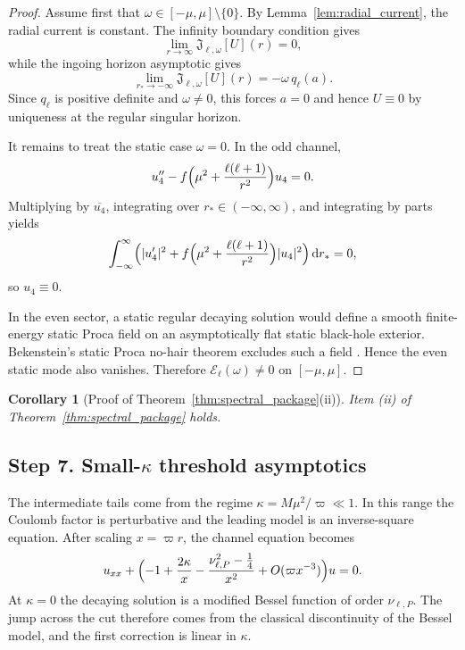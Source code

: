 \documentclass[12pt]{article}
\numberwithin{equation}{section}
\theoremstyle{plain}
\newtheorem{corollary}[theorem]{Corollary}
\theoremstyle{definition}
\theoremstyle{remark}
\newcommand{\dd}{\mathrm d}
\newcommand{\cE}{\mathcal E}
\newcommand{\om}{\omega}
\newcommand{\vp}{\varpi}
\newcommand{\kap}{\kappa}
\begin{document}
\begin{proof}
Assume first that $\om\in[-\mu,\mu]\setminus\{0\}$.  By Lemma~\ref{lem:radial_current}, the radial current is constant.  The infinity boundary condition gives
\[
   \lim_{r\to\infty}\mathfrak J_{\ell,\om}[U](r)=0,
\]
while the ingoing horizon asymptotic gives
\[
   \lim_{r_*\to-\infty}\mathfrak J_{\ell,\om}[U](r)
   =-\om\,q_\ell(a).
\]
Since $q_\ell$ is positive definite and $\om\neq0$, this forces $a=0$ and hence $U\equiv0$ by uniqueness at the regular singular horizon.

It remains to treat the static case $\om=0$.  In the odd channel,
\[
   u_4''-f\Bigl(\mu^2+\frac{\ell(\ell+1)}{r^2}\Bigr)u_4=0.
\]
Multiplying by $\overline{u_4}$, integrating over $r_*\in(-\infty,\infty)$, and integrating by parts yields
\[
   \int_{-\infty}^{\infty}
   \Bigl(
      |u_4'|^2
      +
      f\Bigl(\mu^2+\frac{\ell(\ell+1)}{r^2}\Bigr)|u_4|^2
   \Bigr)\,\dd r_*=0,
\]
so $u_4\equiv0$.

In the even sector, a static regular decaying solution would define a smooth finite-energy static Proca field on an asymptotically flat static black-hole exterior.  Bekenstein's static Proca no-hair theorem excludes such a field \cite{Bekenstein1972a,Bekenstein1972b}.  Hence the even static mode also vanishes.  Therefore $\cE_\ell(\om)\neq0$ on $[-\mu,\mu]$.
\end{proof}

\begin{corollary}[Proof of Theorem~\ref{thm:spectral_package}(ii)]\label{cor:item_ii}
Item \textnormal{(ii)} of Theorem~\ref{thm:spectral_package} holds.
\end{corollary}

\subsection*{Step 7. Small-$\kap$ threshold asymptotics}

The intermediate tails come from the regime $\kap=M\mu^2/\vp\ll1$.  In this range the Coulomb factor is perturbative and the leading model is an inverse-square equation.  After scaling $x=\vp r$, the channel equation becomes
\[
   u_{xx}+\Bigl(-1+\frac{2\kap}{x}-\frac{\nu_{\ell,P}^2-\frac14}{x^2}+O(\vp x^{-3})\Bigr)u=0.
\]
At $\kap=0$ the decaying solution is a modified Bessel function of order $\nu_{\ell,P}$.  The jump across the cut therefore comes from the classical discontinuity of the Bessel model, and the first correction is linear in $\kap$.
\end{document}
